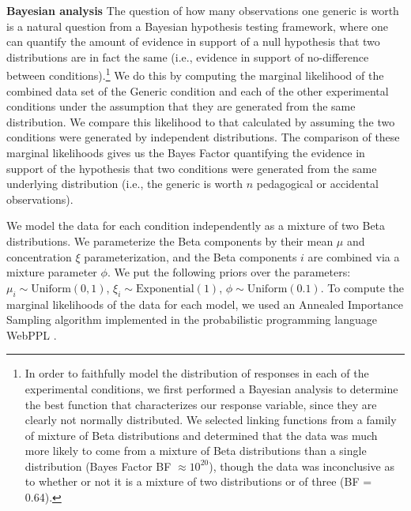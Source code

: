 \documentclass[10pt,letterpaper]{article}
\begin{document}



\noindent\textbf{Bayesian analysis}
The question of how many observations one generic is worth is a natural question from a Bayesian hypothesis testing framework, where one can quantify the amount of evidence in support of a null hypothesis that two distributions are in fact the same (i.e., evidence in support of no-difference between conditions).\footnote{
In order to faithfully model the distribution of responses in each of the experimental conditions, we first performed a Bayesian analysis to determine the best function that characterizes our response variable, since they are clearly not normally distributed. We selected linking functions from a family of mixture of Beta distributions and determined that the data was much more likely to come from a mixture of Beta distributions than a single distribution (Bayes Factor BF $\approx 10^{20}$), though the data was inconclusive as to whether or not it is a mixture of two distributions or of three (BF = 0.64).  
}
We do this by computing the marginal likelihood of the combined data set of the Generic condition and each of the other experimental conditions under the assumption that they are generated from the same distribution. 
We compare this likelihood to that calculated by assuming the two conditions were generated by independent distributions. 
The comparison of these marginal likelihoods gives us the Bayes Factor quantifying the evidence in support of the hypothesis that two conditions were generated from the same underlying distribution (i.e., the generic is worth $n$ pedagogical or accidental observations). 


We model the data for each condition independently as a mixture of two Beta distributions.
We parameterize the Beta components by their mean $\mu$ and concentration $\xi$ parameterization, and the Beta components $i$ are combined via a mixture parameter $\phi$. 
We put the following priors over the parameters: $\mu_i \sim \text{Uniform}(0,1)$, $\xi_i \sim \text{Exponential}(1)$, $\phi \sim \text{Uniform}(0. 1)$.
To compute the marginal likelihoods of the data for each model, we used an Annealed Importance Sampling algorithm \cite{neal2001annealed} implemented in the probabilistic programming language WebPPL \cite{dippl}. 
\end{document}

